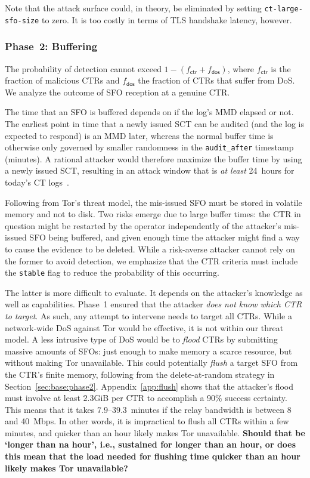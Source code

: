 Note that the attack surface could, in theory, be eliminated by setting
\texttt{ct-large-sfo-size} to zero.  It is too costly in terms of TLS handshake
latency, however.

\subsubsection{Phase~2: Buffering} \label{sec:analysis:pr:phase2}
The probability of detection cannot exceed $1-(f_{\mathsf{ctr}} +
f_{\mathsf{dos}})$, where $f_{\mathsf{ctr}}$ is the fraction of
malicious CTRs and $f_{\mathsf{dos}}$ the fraction of CTRs that suffer from
DoS.  We analyze the outcome of SFO reception at a genuine CTR\@.

The time that an SFO is buffered depends on if the log's MMD elapsed or not.
The earliest point in time that a newly issued SCT can be audited (and the log
is expected to respond) is an MMD later, whereas the normal buffer time is
otherwise only governed by smaller randomness in the \texttt{audit\_after}
timestamp (minutes).  A rational attacker would therefore maximize the buffer
time by using a newly issued SCT, resulting in an attack window that is \emph{at
least} 24~hours for today's CT logs~\cite{google-log-policy}.

Following from Tor's threat model, the mis-issued SFO must be stored in volatile
memory and not to disk.  Two risks emerge due to large buffer times:
	the CTR in question might be restarted by the operator independently of the
		attacker's mis-issued SFO being buffered,
	and given enough time the attacker might find a way to cause the evidence to
		be deleted.
While a risk-averse attacker cannot rely on the former to avoid detection, we
emphasize that the CTR criteria must include the \texttt{stable} flag to reduce
the probability of this occurring.

The latter is more difficult to evaluate.  It depends on the attacker's
knowledge as well as capabilities.  Phase~1 ensured that the attacker \emph{does
not know which CTR to target}.  As such, any attempt to intervene needs to
target all CTRs.  While a network-wide DoS against Tor would be effective, it is
not within our threat model.  A less intrusive type of DoS would be to
\emph{flood} CTRs by submitting massive amounts of SFOs:
	just enough to make memory a scarce resource, but
	without making Tor unavailable.
This could potentially \emph{flush} a target SFO from the CTR's finite memory,
following from the delete-at-random strategy in Section~\ref{sec:base:phase2}.
Appendix~\ref{app:flush} shows that the attacker's flood must involve at least
$2.3$GiB per CTR to accomplish a 90\% success certainty.  This means that it
takes $7.9$--$39.3$~minutes if the relay bandwidth is between 8 and 40~Mbps.
In other words, it is impractical to flush all CTRs within a few minutes, and
quicker than an hour likely makes Tor unavailable. {\bf \color{red}
  Should that be `longer than na hour', i.e., sustained for longer
  than an hour, or does this mean that the load needed for flushing time
  quicker than an hour likely makes Tor unavailable?}

